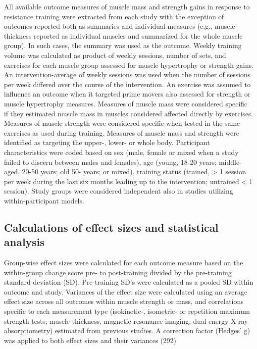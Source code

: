 \documentclass[twoside,10pt]{gihclass} %
\begin{document}
All available outcome measures of muscle mass and strength gains in
response to resistance training were extracted from each study with the exception of outcomes reported both as summaries and individual measures (e.g., muscle thickness reported as individual muscles and summarized for the whole muscle group). In such cases, the summary was used as the outcome. Weekly training volume was calculated as product of weekly sessions, number of sets, and exercises for each muscle group assessed for muscle hypertrophy or strength gains. An intervention-average of weekly sessions was used when the number of sessions per week differed over the course of the intervention. An exercise was assumed to influence an outcome when it targeted prime movers also assessed for strength or muscle hypertrophy measures.
Measures of muscle mass were considered specific if they estimated muscle mass in muscles considered affected directly by exercises. Measures of muscle strength were considered specific when tested in the same exercises as used during training. Measures of muscle mass and strength were identified as targeting the upper-, lower- or whole body.
Participant characteristics were coded based on sex (male, female or mixed when a study failed to discern between males and females), age (young, 18-20 years; middle-aged, 20-50 years; old 50- years; or mixed), training status (trained, \textgreater{} 1 session per week during the last six months leading up to the intervention; untrained \textless{} 1 session). Study groups were considered independent also in studies utilizing within-participant models.

\hypertarget{calculations-of-effect-sizes-and-statistical-analysis}{%
\subsection{Calculations of effect sizes and statistical analysis}\label{calculations-of-effect-sizes-and-statistical-analysis}}

Group-wise effect sizes were calculated for each outcome measure based
on the within-group change score pre- to post-training divided by the
pre-training standard deviation (SD). Pre-training SD's were calculated
as a pooled SD within outcome and study. Variances of the effect size
were calculated using an average effect size across all outcomes within
muscle strength or mass, and correlations specific to each measurement
type (isokinetic-, isometric- or repetition maximum strength tests;
muscle thickness, magnetic resonance imaging, dual-energy X‐ray
absorptiometry) estimated from previous studies.
A correction factor (Hedges' g) was applied to both effect sizes and their
variances
(292)
\end{document}
